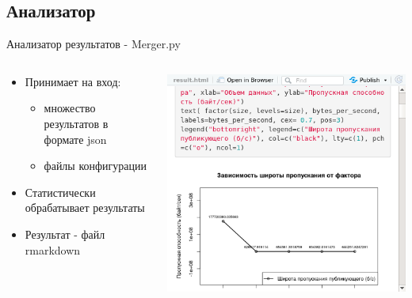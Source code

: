 \subsection{Анализатор}
\begin{frame}{Анализатор результатов - Merger.py}
	\begin{columns}[onlytextwidth]
		\hspace{-0.5cm}
		\begin{column}{0.45\textwidth}
			\begin{itemize}
				\item Принимает на вход:
				\begin{itemize}
					\item множество результатов в формате json
					\item файлы конфигурации
				\end{itemize}
				\item Статистически обрабатывает результаты
				\item Результат - файл rmarkdown
			\end{itemize}
		\end{column}
		\begin{column}{0.6\textwidth}
			\includegraphics[width=\textwidth]{img/tmp.png}
		\end{column}
	\end{columns}
	
\end{frame}

